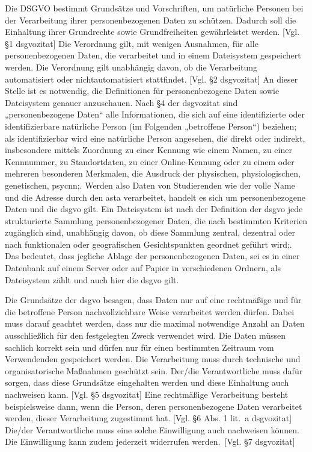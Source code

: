 Die DSGVO bestimmt Grundsätze und Vorschriften, um natürliche Personen bei der Verarbeitung ihrer personenbezogenen Daten zu schützen. Dadurch soll die Einhaltung ihrer Grundrechte sowie Grundfreiheiten gewährleistet werden. [Vgl. §1 \gls{dsgvozitat}] Die Verordnung gilt, mit wenigen Ausnahmen, für alle personenbezogenen Daten, die verarbeitet und in einem Dateisystem gespeichert werden. Die Verordnung gilt unabhängig davon, ob die Verarbeitung automatisiert oder nichtautomatisiert stattfindet. [Vgl. §2 \gls{dsgvozitat}] An dieser Stelle ist es notwendig, die Definitionen für \glqq{}personenbezogene Daten\grqq{} sowie \glqq{}Dateisystem\grqq{} genauer anzuschauen. Nach §4 der \gls{dsgvozitat} sind \glqq{}„personenbezogene Daten“ alle Informationen, die sich auf eine identifizierte oder identifizierbare natürliche Person (im Folgenden „betroffene Person“) beziehen; als identifizierbar wird eine natürliche Person angesehen, die direkt oder indirekt, insbesondere mittels Zuordnung zu einer Kennung wie einem Namen, zu einer Kennnummer, zu Standortdaten, zu einer Online-Kennung oder zu einem oder mehreren besonderen Merkmalen, die Ausdruck der physischen, physiologischen, genetischen, psycnn;\grqq{}. Werden also Daten von Studierenden wie der volle Name und die Adresse durch den \gls{asta} verarbeitet, handelt es sich um personenbezogene Daten und die \gls{dsgvo} gilt. Ein Dateisystem ist nach der Definition der \gls{dsgvo} \glqq{}jede strukturierte Sammlung personenbezogener Daten, die nach bestimmten Kriterien zugänglich sind, unabhängig davon, ob diese Sammlung zentral, dezentral oder nach funktionalen oder geografischen Gesichtspunkten geordnet geführt wird;\grqq{}. Das bedeutet, dass jegliche Ablage der personenbezogenen Daten, sei es in einer Datenbank auf einem Server oder auf Papier in verschiedenen Ordnern, als Dateisystem zählt und auch hier die \gls{dsgvo} gilt.

Die Grundsätze der \gls{dsgvo} besagen, dass Daten nur auf eine rechtmäßige und für die betroffene Person nachvollziehbare Weise verarbeitet werden dürfen. Dabei muss darauf geachtet werden, dass nur die maximal notwendige Anzahl an Daten ausschließlich für den festgelegten Zweck verwendet wird. Die Daten müssen sachlich korrekt sein und dürfen nur für einen bestimmten Zeitraum vom Verwendenden gespeichert werden. Die Verarbeitung muss durch technische und organisatorische Maßnahmen geschützt sein. Der/die Verantwortliche muss dafür sorgen, dass diese Grundsätze eingehalten werden und diese Einhaltung auch nachweisen kann. [Vgl. §5 \gls{dsgvozitat}] Eine rechtmäßige Verarbeitung besteht beispielsweise dann, wenn die Person, deren personenbezogene Daten verarbeitet werden, dieser Verarbeitung zugestimmt hat. [Vgl. §6 Abs. 1 lit.~a \gls{dsgvozitat}] Die/der Verantwortliche muss eine solche Einwilligung auch nachweisen können. Die Einwilligung kann zudem jederzeit widerrufen werden.~[Vgl. §7 \gls{dsgvozitat}] 

